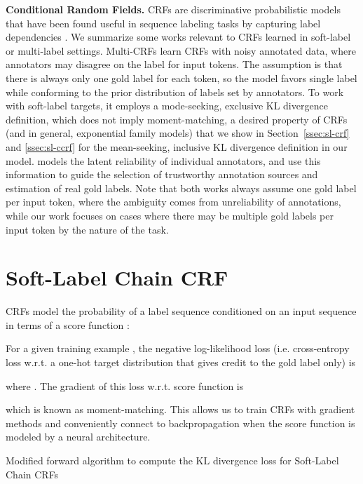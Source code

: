 \documentclass[11pt,a4paper]{article}
\newcommand{\smallsection}[1]{{\noindent\textbf{#1.}}}
\begin{document}
\smallsection{Conditional Random Fields} CRFs \cite{DBLP:conf/icml/LaffertyMP01} are discriminative probabilistic models that have been found useful in sequence labeling tasks by capturing label dependencies \cite{DBLP:conf/acl/MaH16, DBLP:conf/naacl/LampleBSKD16}. We summarize some works relevant to CRFs learned in soft-label or multi-label settings. Multi-CRFs \cite{dredze2009sequence} learn CRFs with noisy annotated data, where annotators may disagree on the label for input tokens. The assumption is that there is always only one gold label for each token, so the model favors single label while conforming to the prior distribution of labels set by annotators. To work with soft-label targets, it employs a mode-seeking, exclusive KL divergence definition, which does not imply moment-matching, a desired property of CRFs (and in general, exponential family models) that we show in Section~\ref{ssec:sl-crf} and \ref{ssec:sl-ccrf} for the mean-seeking, inclusive KL divergence definition in our model. \citet{DBLP:journals/ml/RodriguesPR14} models the latent reliability of individual annotators, and use this information to guide the selection of trustworthy annotation sources and estimation of real gold labels. Note that both works always assume one gold label per input token, where the ambiguity comes from unreliability of annotations, while our work focuses on cases where there may be multiple gold labels per input token by the nature of the task. 

\section{Soft-Label Chain CRF}
\label{sec:sl-ccrf}

CRFs model the probability of a label sequence  conditioned on an input sequence  in terms of a score function : 


For a given training example , the negative log-likelihood loss (i.e. cross-entropy loss w.r.t. a one-hot target distribution that gives credit to the gold label only) is

where . The gradient of this loss w.r.t. score function is

which is known as moment-matching. This allows us to train CRFs with gradient methods and conveniently connect to backpropagation when the score function is modeled by a neural architecture. 

\begin{algorithm*}
\caption{Modified forward algorithm to compute the KL divergence loss for Soft-Label Chain CRFs}
\begin{algorithmic}
		\State 
		\State 
	\EndFor
	\For {}
			\State 
			\State 
		\EndFor
	\EndFor
	\State 
	\State 
	\State 
	\State \Return 
\EndProcedure
\end{algorithmic}
\label{alg:fwd}
\end{algorithm*}
\end{document}
